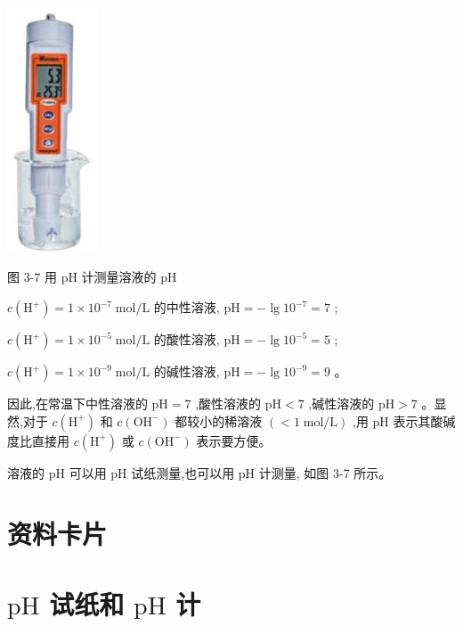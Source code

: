 \documentclass[10pt]{article}
\begin{document}
\begin{center}
\includegraphics[max width=0.2\textwidth]{images/0190da9d-8bfd-732f-bc2c-0b21d0f13b91_70_854886.jpg}
\end{center}

图 3-7 用 \(\mathrm{{pH}}\) 计测量溶液的 \(\mathrm{{pH}}\)

\(c\left( {\mathrm{H}}^{ + }\right) = 1 \times {10}^{-7}\mathrm{\;{mol}}/\mathrm{L}\) 的中性溶液, \(\mathrm{{pH}} = - \lg {10}^{-7} = 7\) ;

\(c\left( {\mathrm{H}}^{ + }\right) = 1 \times {10}^{-5}\mathrm{\;{mol}}/\mathrm{L}\) 的酸性溶液, \(\mathrm{{pH}} = - \lg {10}^{-5} = 5\) ;

\(c\left( {\mathrm{H}}^{ + }\right) = 1 \times {10}^{-9}\mathrm{\;{mol}}/\mathrm{L}\) 的碱性溶液, \(\mathrm{{pH}} = - \lg {10}^{-9} = 9\) 。

因此,在常温下中性溶液的 \(\mathrm{{pH}} = 7\) ,酸性溶液的 \(\mathrm{{pH}} < 7\) ,碱性溶液的 \(\mathrm{{pH}} > 7\) 。显然,对于 \(c\left( {\mathrm{H}}^{ + }\right)\) 和 \(c\left( {\mathrm{{OH}}}^{ - }\right)\) 都较小的稀溶液 \(\left( { < 1\mathrm{\;{mol}}/\mathrm{L}}\right)\) ,用 \(\mathrm{{pH}}\) 表示其酸碱度比直接用 \(c\left( {\mathrm{H}}^{ + }\right)\) 或 \(c\left( {\mathrm{{OH}}}^{ - }\right)\) 表示要方便。

溶液的 \(\mathrm{{pH}}\) 可以用 \(\mathrm{{pH}}\) 试纸测量,也可以用 \(\mathrm{{pH}}\) 计测量, 如图 3-7 所示。

\section*{资料卡片}

\section*{\(\mathrm{{pH}}\) 试纸和 \(\mathrm{{pH}}\) 计}
\end{document}
